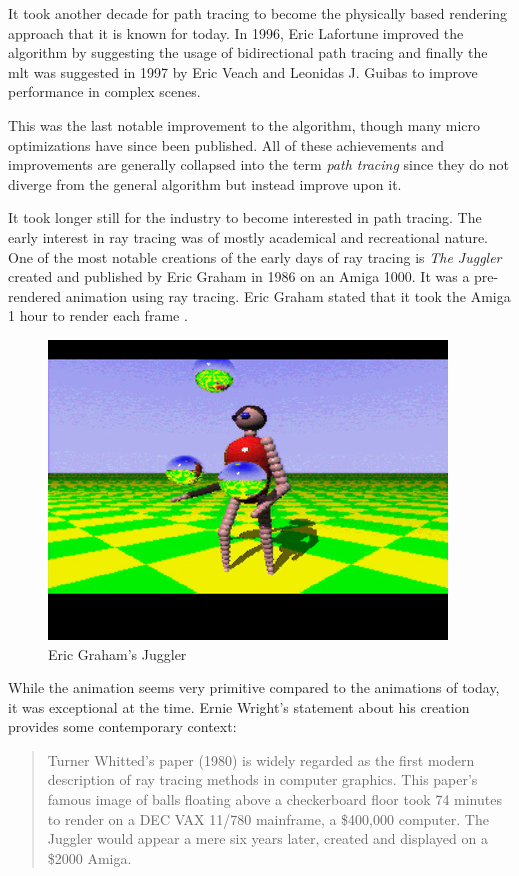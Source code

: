 \documentclass[
  twoside,
  11pt, a4paper,
  footinclude=true,
  headinclude=true,
  cleardoublepage=empty
]{scrreprt}
\begin{document}
It took another decade for path tracing to become the
physically based rendering approach that it is known for today. In 1996, Eric Lafortune improved
the algorithm by suggesting the usage of bidirectional path tracing \cite{techreport:pbr} and
finally the \ac{mlt} was suggested in 1997 by Eric Veach and Leonidas J. Guibas \cite{inproceedings:metropolis} to
improve performance in complex scenes.

This was the last notable improvement to the algorithm,
though many micro optimizations have since been published. All of these achievements and
improvements are generally collapsed into the term \emph{path tracing} since they do not diverge
from the general algorithm but instead improve upon it.

It took longer still for the industry to become interested in path tracing. The early interest in
ray tracing was of mostly academical and recreational nature. One of the most notable creations of
the early days of ray tracing is \emph{The Juggler} created and published by Eric Graham in 1986
\cite{site:juggler} on an Amiga 1000. It was a pre-rendered animation using ray tracing. Eric Graham
stated that it took the Amiga 1 hour to render each frame \cite{site:juggler}.

\begin{figure}[H]
    \includegraphics[scale=0.5]{amiga-juggler}
    \centering
    \caption{Eric Graham's Juggler}
    \label{fig:amiga-juggler}
\end{figure}
While the animation seems very primitive compared to the animations of today, it was exceptional at
the time. Ernie Wright's statement about his creation provides some contemporary context:

\blockquote[\cite{site:juggler}]{Turner Whitted's paper (1980) is widely regarded as the first modern
    description of ray tracing methods in computer graphics. This paper's famous image of balls floating
    above a checkerboard floor took 74 minutes to render on a DEC VAX 11/780 mainframe, a \$400,000
computer. The Juggler would appear a mere six years later, created and displayed on a \$2000 Amiga.}
\end{document}
